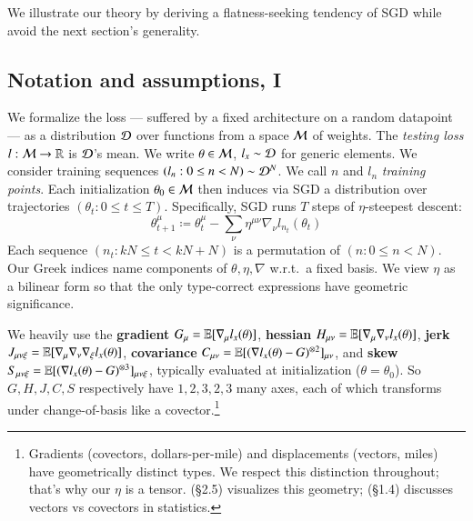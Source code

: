   We illustrate our theory by deriving a %
flatness-seeking tendency of SGD while avoid the next section's generality.

\subsection{Notation and assumptions, I}\label{sect:setup}

  We formalize the loss --- suffered by a fixed architecture on a random
datapoint --- as a distribution $\mathcal{D}$ over functions from a space $\mathcal{M}$ of
weights.  The \emph{testing loss} $l:\mathcal{M}\to\mathbb{R}$ is $\mathcal{D}$'s mean.  We write
$\theta\in\mathcal{M}$, $l_x\sim\mathcal{D}$ for generic elements.
%
We consider training sequences $(l_n: 0\leq n<N) \sim \mathcal{D}^N$.  We call
$n$ and $l_n$ \emph{training points}.
%
Each initialization $\theta_0 \in \mathcal{M}$ then induces via SGD a
distribution over trajectories $(\theta_t: 0\leq t \leq T)$.  Specifically,
SGD runs $T$ steps of $\eta$-steepest descent:
  \begin{equation*}
    \theta_{t+1}^\mu
    \coloneqq
    \theta_t^\mu -
    \sum_{\nu}
    \eta^{\mu\nu} \nabla_\nu l_{n_t}(\theta_t)
  \end{equation*}
Each sequence $(n_t: kN\leq t<kN+N)$ is a permutation of $(n:
0\leq n<N)$.  Our Greek indices name components of
$\theta,\eta,\nabla$ w.r.t.\ a fixed basis.  We view $\eta$
as a bilinear form
so that the only type-correct expressions have geometric significance.
%

We heavily use the
\textbf{gradient} $G_\mu = \mathbb{E}[\nabla_\mu l_x(\theta)]$, %
\textbf{hessian} $H_{\mu\nu} = \mathbb{E}[\nabla_\mu\nabla_\nu l_x(\theta)]$, %
\textbf{jerk} \squish $J_{\mu\nu\xi} = \mathbb{E}[\nabla_\mu\nabla_\nu\nabla_\xi l_x(\theta)]$, %
\textbf{covariance} $C_{\mu\nu} = \mathbb{E}[(\nabla l_x(\theta) - G)^{\otimes 2}]_{\mu\nu}$, %
and
\textbf{skew} \squash $S_{\mu\nu\xi} = \mathbb{E}[(\nabla l_x(\theta) - G)^{\otimes 3}]_{\mu\nu\xi}$, %
typically evaluated at
initialization ($\theta=\theta_0$).
So $G, H, J, C, S$ respectively have $1, 2, 3, 2, 3$ many axes, each of which
transforms under change-of-basis like a covector.\footnote{
    Gradients
    (covectors, dollars-per-mile) and displacements (vectors, miles) have geometrically
    distinct types.  We respect this distinction throughout; that's
    why our $\eta$ is a tensor.
    \cite{mi73} (\S2.5) visualizes this geometry;
    \cite{cu87} (\S1.4) discusses vectors vs covectors in statistics.
}

